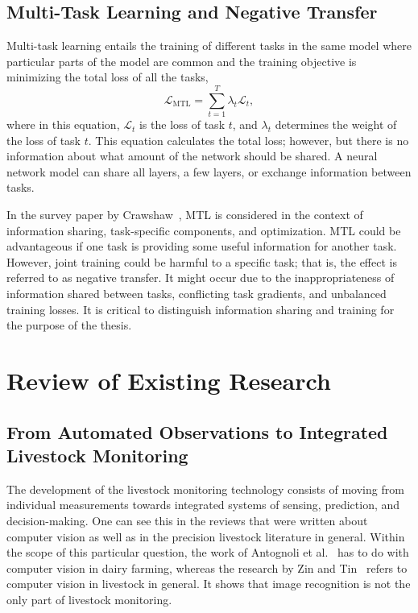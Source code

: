 \subsection{Multi-Task Learning and Negative Transfer}

Multi-task learning entails the training of different tasks in the same model where particular parts of the model are common and the training objective is minimizing the total loss of all the tasks,
\begin{equation}
    \mathcal{L}_{\mathrm{MTL}}=\sum_{t=1}^{T}\lambda_t\mathcal{L}_t,
\end{equation}
where in this equation, $\mathcal{L}_t$ is the loss of task $t$, and $\lambda_t$ determines the weight of the loss of task $t$. This equation calculates the total loss; however, but there is no information about what amount of the network should be shared. A neural network model can share all layers, a few layers, or exchange information between tasks.

In the survey paper by Crawshaw~\cite{crawshaw2020mtl}, MTL is considered in the context of information sharing, task-specific components, and optimization. MTL could be advantageous if one task is providing some useful information for another task. However, joint training could be harmful to a specific task; that is, the effect is referred to as negative transfer. It might occur due to the inappropriateness of information shared between tasks, conflicting task gradients, and unbalanced training losses. It is critical to distinguish information sharing and training for the purpose of the thesis.

\section{Review of Existing Research}

\subsection{From Automated Observations to Integrated Livestock Monitoring}

The development of the livestock monitoring technology consists of moving from individual measurements towards integrated systems of sensing, prediction, and decision-making. One can see this in the reviews that were written about computer vision as well as in the precision livestock literature in general. Within the scope of this particular question, the work of Antognoli et al.~\cite{antognoli2025ani1} has to do with computer vision in dairy farming, whereas the research by Zin and Tin~\cite{zin2026ab26} refers to computer vision in livestock in general. It shows that image recognition is not the only part of livestock monitoring.


